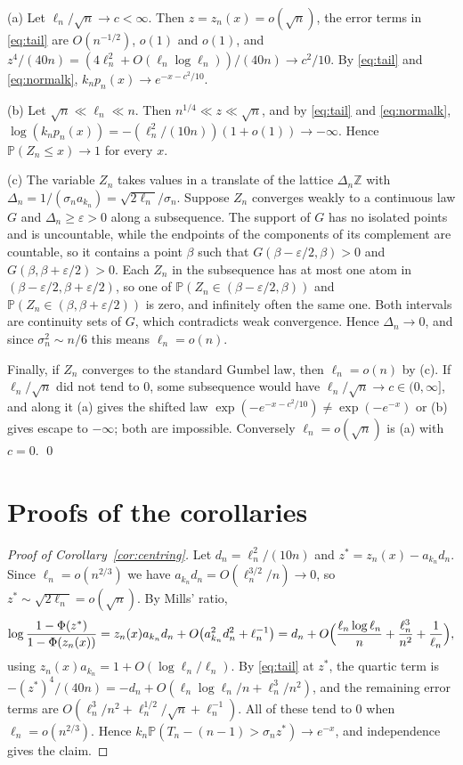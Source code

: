 \documentclass[11pt]{amsart}
\theoremstyle{remark}
\renewcommand{\P}{\mathbb{P}}
\newcommand{\Z}{\mathbb{Z}}
\begin{document}
(a) Let $\ell_n/\sqrt n\to c<\infty$. Then $z=z_n(x)=o(\sqrt n)$, the error terms in \eqref{eq:tail} are $O(n^{-1/2})$, $o(1)$ and $o(1)$, and $z^4/(40n)=(4\ell_n^2+O(\ell_n\log\ell_n))/(40n)\to c^2/10$. By \eqref{eq:tail} and \eqref{eq:normalk}, $k_np_n(x)\to e^{-x-c^2/10}$.

(b) Let $\sqrt n\ll\ell_n\ll n$. Then $n^{1/4}\ll z\ll\sqrt n$, and by \eqref{eq:tail} and \eqref{eq:normalk}, $\log(k_np_n(x))=-(\ell_n^2/(10n))(1+o(1))\to-\infty$. Hence $\P(Z_n\le x)\to1$ for every $x$.

(c) The variable $Z_n$ takes values in a translate of the lattice $\Delta_n\Z$ with $\Delta_n=1/(\sigma_na_{k_n})=\sqrt{2\ell_n}/\sigma_n$. Suppose $Z_n$ converges weakly to a continuous law $G$ and $\Delta_n\ge\varepsilon>0$ along a subsequence. The support of $G$ has no isolated points and is uncountable, while the endpoints of the components of its complement are countable, so it contains a point $\beta$ such that $G(\beta-\varepsilon/2,\beta)>0$ and $G(\beta,\beta+\varepsilon/2)>0$. Each $Z_n$ in the subsequence has at most one atom in $(\beta-\varepsilon/2,\beta+\varepsilon/2)$, so one of $\P(Z_n\in(\beta-\varepsilon/2,\beta))$ and $\P(Z_n\in(\beta,\beta+\varepsilon/2))$ is zero, and infinitely often the same one. Both intervals are continuity sets of $G$, which contradicts weak convergence. Hence $\Delta_n\to0$, and since $\sigma_n^2\sim n/6$ this means $\ell_n=o(n)$.

Finally, if $Z_n$ converges to the standard Gumbel law, then $\ell_n=o(n)$ by (c). If $\ell_n/\sqrt n$ did not tend to $0$, some subsequence would have $\ell_n/\sqrt n\to c\in(0,\infty]$, and along it (a) gives the shifted law $\exp(-e^{-x-c^2/10})\ne\exp(-e^{-x})$ or (b) gives escape to $-\infty$; both are impossible. Conversely $\ell_n=o(\sqrt n)$ is (a) with $c=0$. \qed


\section{Proofs of the corollaries}\label{sec:cor}

\begin{proof}[Proof of Corollary~\ref{cor:centring}]
Let $d_n=\ell_n^2/(10n)$ and $z^*=z_n(x)-a_{k_n}d_n$. Since $\ell_n=o(n^{2/3})$ we have $a_{k_n}d_n=O(\ell_n^{3/2}/n)\to0$, so $z^*\sim\sqrt{2\ell_n}=o(\sqrt n)$. By Mills' ratio,
\[
\log\frac{1-\Phi(z^*)}{1-\Phi(z_n(x))}=z_n(x)a_{k_n}d_n+O\bigl(a_{k_n}^2d_n^2+\ell_n^{-1}\bigr)=d_n+O\Bigl(\frac{\ell_n\log\ell_n}n+\frac{\ell_n^3}{n^2}+\frac1{\ell_n}\Bigr),
\]
using $z_n(x)a_{k_n}=1+O(\log\ell_n/\ell_n)$. By \eqref{eq:tail} at $z^*$, the quartic term is $-(z^*)^4/(40n)=-d_n+O(\ell_n\log\ell_n/n+\ell_n^3/n^2)$, and the remaining error terms are $O(\ell_n^3/n^2+\ell_n^{1/2}/\sqrt n+\ell_n^{-1})$. All of these tend to $0$ when $\ell_n=o(n^{2/3})$. Hence $k_n\P(T_n-(n-1)>\sigma_nz^*)\to e^{-x}$, and independence gives the claim.
\end{proof}
\end{document}
